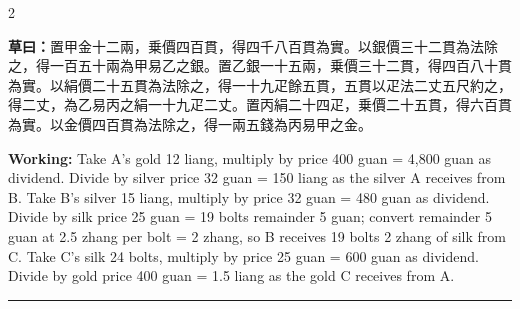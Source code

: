 \documentclass[11pt,a4paper]{article}
\newcommand{\longline}{\noindent\rule{\textwidth}{0.4pt}}
\newcommand{\WorkingText}[1]{\par\noindent\textbf{草曰：}#1\par}
\newcommand{\WorkingEn}[1]{\par\noindent\textbf{Working:} #1\par}
\begin{document}
\begin{paracol}{2}
\WorkingText{置甲金十二兩，乗價四百貫，得四千八百貫為實。以銀價三十二貫為法除之，得一百五十兩為甲易乙之銀。置乙銀一十五兩，乗價三十二貫，得四百八十貫為實。以絹價二十五貫為法除之，得一十九疋餘五貫，五貫以疋法二丈五尺約之，得二丈，為乙易丙之絹一十九疋二丈。置丙絹二十四疋，乗價二十五貫，得六百貫為實。以金價四百貫為法除之，得一兩五錢為丙易甲之金。}
\switchcolumn
\WorkingEn{Take A's gold 12 liang, multiply by price 400 guan = 4,800 guan as dividend. Divide by silver price 32 guan = 150 liang as the silver A receives from B. Take B's silver 15 liang, multiply by price 32 guan = 480 guan as dividend. Divide by silk price 25 guan = 19 bolts remainder 5 guan; convert remainder 5 guan at 2.5 zhang per bolt = 2 zhang, so B receives 19 bolts 2 zhang of silk from C. Take C's silk 24 bolts, multiply by price 25 guan = 600 guan as dividend. Divide by gold price 400 guan = 1.5 liang as the gold C receives from A.}

\end{paracol}

\longline
\end{document}
